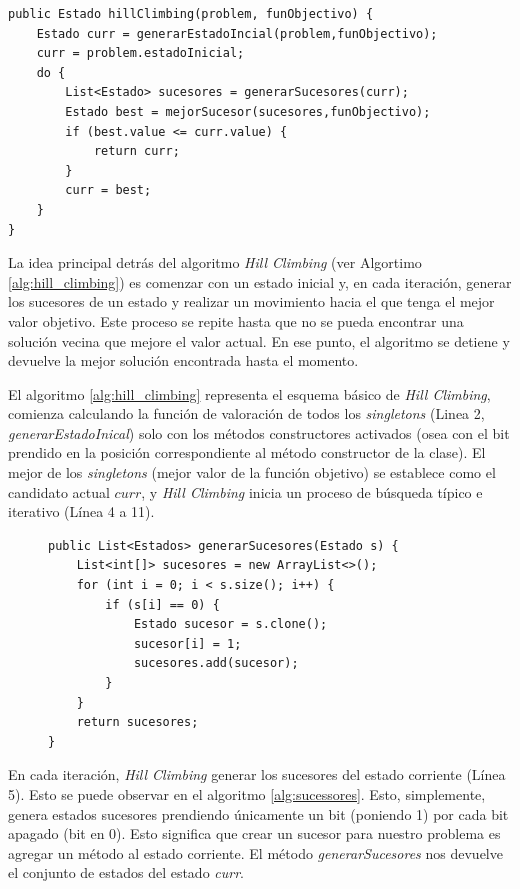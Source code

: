 \begin{lstlisting}[style=javaStyle, caption={Algoritmo de Hill Climbing}, label={alg:hill_climbing}]
public Estado hillClimbing(problem, funObjectivo) {
    Estado curr = generarEstadoIncial(problem,funObjectivo);
    curr = problem.estadoInicial;
    do {
        List<Estado> sucesores = generarSucesores(curr);
        Estado best = mejorSucesor(sucesores,funObjectivo);
        if (best.value <= curr.value) {
            return curr;
        }
        curr = best;
    }
}
\end{lstlisting}

La idea principal detrás del algoritmo \emph{Hill Climbing} (ver Algortimo \ref{alg:hill_climbing}) es comenzar con un estado inicial y, en cada iteración, generar los sucesores de un estado y realizar un movimiento hacia el que tenga el mejor valor objetivo. Este proceso se repite hasta que no se pueda encontrar una solución vecina que mejore el valor actual. En ese punto, el algoritmo se detiene y devuelve la mejor solución encontrada hasta el momento.


El algoritmo \ref{alg:hill_climbing} representa el esquema básico de \emph{Hill Climbing}, comienza
calculando la función de valoración de todos los \emph{singletons} (Linea 2, \emph{generarEstadoInical}) solo con los métodos constructores activados (osea con el bit prendido en la posición correspondiente al método constructor de la clase).  El mejor de los \emph{singletons} (mejor valor de la función objetivo) se establece como el candidato actual $curr$, y \emph{Hill Climbing} inicia un proceso de búsqueda típico e iterativo (Línea 4 a 11).

\begin{figure}[H]
\begin{lstlisting}[style=javaStyle, caption={Algoritmo de Hill Climbing}, label={alg:sucessores}]
public List<Estados> generarSucesores(Estado s) {
    List<int[]> sucesores = new ArrayList<>();  
    for (int i = 0; i < s.size(); i++) {
        if (s[i] == 0) {
            Estado sucesor = s.clone();
            sucesor[i] = 1;
            sucesores.add(sucesor);
        }
    }
    return sucesores;
}
\end{lstlisting}
\end{figure}
En cada iteración, \emph{Hill Climbing} generar los sucesores del estado corriente (Línea 5). Esto se puede observar en el algoritmo \ref{alg:sucessores}. Esto, simplemente, genera estados sucesores prendiendo únicamente un bit (poniendo 1) por cada bit apagado (bit en 0). Esto significa que crear un sucesor para nuestro problema es agregar un método al estado corriente. El método \emph{generarSucesores} nos devuelve el conjunto de estados del estado \emph{curr}.


